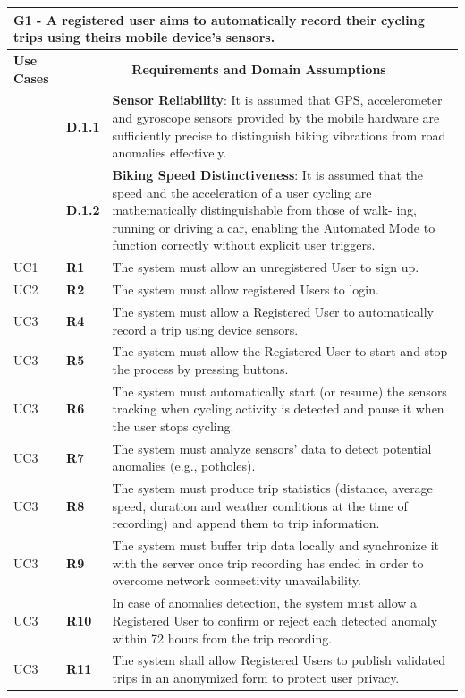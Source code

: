 \begin{longtable}{|p{2.5cm}|p{1cm}|p{10.5cm}|}
\hline
\multicolumn{3}{|p{14.5cm}|}{\centering \textbf{G1 - A registered user aims to automatically record their cycling trips using theirs
mobile device’s sensors.}} \\
\hline
\textbf{Use Cases} & \multicolumn{2}{c|}{\textbf{Requirements and Domain Assumptions}} \\
\hline
& \textbf{D.1.1} & \textbf{Sensor Reliability}: It is assumed that GPS, accelerometer and gyroscope
sensors provided by the mobile hardware are sufficiently precise to distinguish biking
vibrations from road anomalies effectively. \\
\hline
& \textbf{D.1.2} & \textbf{Biking Speed Distinctiveness}: It is assumed that the speed and the
acceleration of a user cycling are mathematically distinguishable from those of walk-
ing, running or driving a car, enabling the Automated Mode to function correctly
without explicit user triggers. \\
\hline
UC1 & \textbf{R1} & The system must allow an unregistered User to sign up. \\
\hline
UC2 & \textbf{R2} & The system must allow registered Users to login. \\
\hline
UC3 & \textbf{R4} & The system must allow a Registered User to automatically record a trip using device sensors. \\
\hline
UC3 & \textbf{R5} & The system must allow the Registered User to start and stop the process by pressing buttons. \\
\hline
UC3 & \textbf{R6} & The system must automatically start (or resume) the sensors tracking when cycling activity is detected and pause it when the user stops cycling.\\
\hline
UC3 &\textbf{R7} & The system must analyze sensors' data to detect potential anomalies (e.g., potholes).\\
\hline
UC3     &\textbf{R8} & The system must produce trip statistics (distance, average speed, duration and weather conditions at the time of recording) and append them to trip information.\\
\hline
UC3     &\textbf{R9} & The system must buffer trip data locally and synchronize it with the server once trip recording has ended in order to overcome network connectivity unavailability.\\
\hline
UC3     &\textbf{R10} & In case of anomalies detection, the system must allow a Registered User to confirm or reject each detected anomaly within 72 hours from the trip recording.\\
\hline
UC3     &\textbf{R11} & The system shall allow Registered Users to publish validated trips in an anonymized form to protect user privacy.\\
\hline
\end{longtable}

